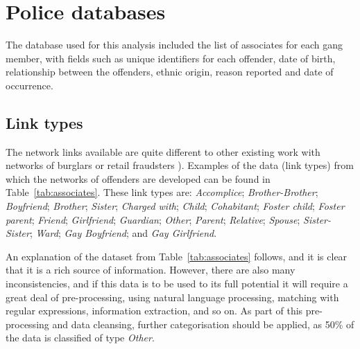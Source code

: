 \documentclass[twocolumn]{svjour3}          %
\theoremstyle{definition}
\begin{document}
\section{Police databases}\label{sec:policedatabases}

The database used for this analysis included the list of associates
for each gang member, with fields such as unique identifiers for each
offender, date of birth, relationship between the offenders, ethnic
origin, reason reported and date of occurrence.

\subsection{Link types}\label{sec:linktypes} 

The network links available are quite different to other existing work
with networks of burglars or retail fraudsters
\citep{OatleyZeleznikowLearyEwart2005,OatleyMcGarryEwart2006,oatley+crick:2014}). Examples
of the data (link types) from which the networks of offenders are
developed can be found in Table~\ref{tab:associates}. These link types
are: \emph{Accomplice}; \emph{Brother-Brother}; \emph{Boyfriend};
\emph{Brother}; \emph{Sister}; \emph{Charged with}; \emph{Child};
\emph{Cohabitant}; \emph{Foster child}; \emph{Foster parent};
\emph{Friend}; \emph{Girlfriend}; \emph{Guardian}; \emph{Other};
\emph{Parent}; \emph{Relative}; \emph{Spouse}; \emph{Sister-Sister};
\emph{Ward}; \emph{Gay Boyfriend}; and \emph{Gay Girlfriend}.

An explanation of the dataset from Table~\ref{tab:associates} follows,
and it is clear that it is a rich source of information. However,
there are also many inconsistencies, and if this data is to be used to
its full potential it will require a great deal of pre-processing,
using natural language processing, matching with regular expressions,
information extraction, and so on. As part of this pre-processing and
data cleansing, further categorisation should be applied, as 50\% of
the data is classified of type \emph{Other}.
\end{document}
